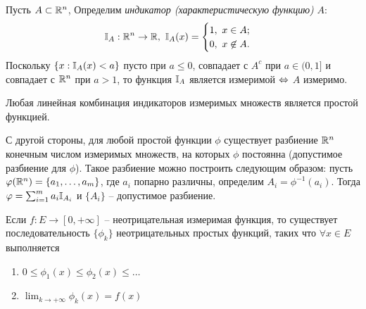 \begin{example}
    Пусть $A \subset \mathbb{R}^{n}$, Определим \textit{индикатор (характеристическую функцию)} $A$:
    \[\mathbb{I}_{A}: \mathbb{R}^{n} \to \mathbb{R}, \ \mathbb{I}_{A}(x) = \begin{cases}
        1, \ x \in A;\\
        0, \ x \not\in A.
    \end{cases}\]
    Поскольку $\{x: \mathbb{I}_{A}(x) < a\}$ пусто при $a \leq 0$, совпадает с $A^{c}$ при $a \in (0, 1]$ и совпадает с $\mathbb{R}^{n}$ при $a > 1$, то функция $\mathbb{I}_{A}$ является измеримой $\Leftrightarrow$ $A$ измеримо.
\end{example}

\begin{note}
    Любая линейная комбинация индикаторов измеримых множеств является простой функцией.

    С другой стороны, для любой простой функции $\phi$ существует разбиение $\mathbb{R}^{n}$ конечным числом измеримых множеств, на которых $\phi$ постоянна (допустимое разбиение для $\phi$). Такое разбиение можно построить следующим образом: пусть $\varphi(\mathbb{R}^{n}) = \{a_{1}, \ldots, a_{m}\}$, где $a_{i}$ попарно различны, определим $A_{i} = \phi^{-1}(a_{i})$. Тогда $\varphi = \sum_{i = 1}^{m}a_{i} \mathbb{I}_{A_{i}}$ и $\{A_{i}\}$ -- допустимое разбиение.
\end{note}

\begin{theorem}
    Если $f: E \to [0, +\infty]$ -- неотрицательная измеримая функция, то существует последовательность $\{\phi_{k}\}$ неотрицательных простых функций, таких что $\forall x \in E$ выполняется
    \begin{enumerate}
        \item $0 \leq \phi_{1}(x) \leq \phi_{2}(x) \leq \ldots$
        \item $\lim_{k \to +\infty}\phi_{k}(x) = f(x)$
    \end{enumerate}
\end{theorem}

